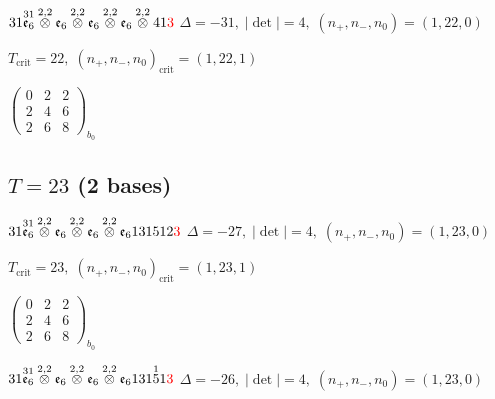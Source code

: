 \documentclass[10pt]{article}
\begin{document}
\smallskip

$31\overset{31}{\mathfrak{e}_6}\overset{2,2}{\otimes}\mathfrak{e}_6\overset{2,2}{\otimes}\mathfrak{e}_6\overset{2,2}{\otimes}\mathfrak{e}_6\overset{2,2}{\otimes}41\textcolor{red}{3}$ \quad $\Delta=-31,\; |\det|=4,\; (n_+,n_-,n_0)=(1,22,0)$

\hspace{1em}$T_{\text{crit}}=22,\; (n_+,n_-,n_0)_{\text{crit}}=(1,22,1)$

\hspace{2em}$\left(\begin{smallmatrix}0 & 2 & 2 \\ 2 & 4 & 6 \\ 2 & 6 & 8\end{smallmatrix}\right)_{\!b_0}$


\subsection*{$T = 23$ \quad (2 bases)}
\smallskip

$31\overset{31}{\mathfrak{e}_6}\overset{2,2}{\otimes}\mathfrak{e}_6\overset{2,2}{\otimes}\mathfrak{e}_6\overset{2,2}{\otimes}\mathfrak{e}_6131512\textcolor{red}{3}$ \quad $\Delta=-27,\; |\det|=4,\; (n_+,n_-,n_0)=(1,23,0)$

\hspace{1em}$T_{\text{crit}}=23,\; (n_+,n_-,n_0)_{\text{crit}}=(1,23,1)$

\hspace{2em}$\left(\begin{smallmatrix}0 & 2 & 2 \\ 2 & 4 & 6 \\ 2 & 6 & 8\end{smallmatrix}\right)_{\!b_0}$

\smallskip

$31\overset{31}{\mathfrak{e}_6}\overset{2,2}{\otimes}\mathfrak{e}_6\overset{2,2}{\otimes}\mathfrak{e}_6\overset{2,2}{\otimes}\mathfrak{e}_6131\overset{1}{5}1\textcolor{red}{3}$ \quad $\Delta=-26,\; |\det|=4,\; (n_+,n_-,n_0)=(1,23,0)$
\end{document}

